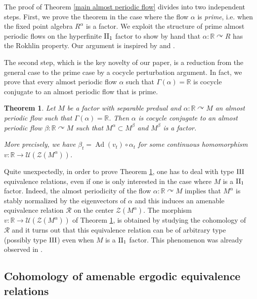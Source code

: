 \documentclass[a4paper,11pt]{amsart}
\numberwithin{equation}{section}
\newtheorem{letterthm}{Theorem}
\theoremstyle{definition}
\newcommand{\R}{\mathbb{R}}
\newcommand{\cZ}{\mathcal{Z}}
\newcommand{\cU}{\mathcal{U}}
\newcommand{\Ad}{\operatorname{Ad}}
\newcommand{\cR}{\mathcal{R}}
\newcommand{\II}{{\rm II}}
\newcommand{\III}{{\rm III}}
\begin{document}
The proof of Theorem \ref{main almost periodic flow} divides into two independent steps. First, we prove the theorem in the case where the flow $\alpha$ is \emph{prime}, i.e.\! when the fixed point algebra $R^\alpha$ is a factor. We exploit the structure of prime almost periodic flows on the hyperfinite $\II_1$ factor \cite{Jo82, OPT79} to show by hand that $\alpha : \R \curvearrowright R$ has the Rokhlin property. Our argument is inspired by \cite[Theorem 6.12]{MT12} and \cite[Proposition 2.5]{Ki95}.

The second step, which is the key novelty of our paper, is a reduction from the general case to the prime case by a cocycle perturbation argument. In fact, we prove that every almost periodic flow $\alpha$ such that $\Gamma(\alpha)=\R$ is cocycle conjugate to an almost periodic flow that is prime.
 
\begin{letterthm} \label{cocycle perturbation flow}
    Let $M$ be a factor with separable predual and $\alpha : \R \curvearrowright M$ an almost periodic flow such that $\Gamma(\alpha) = \R$. Then $\alpha$ is cocycle conjugate to an almost periodic flow $\beta : \R \curvearrowright M$ such that  $M^\alpha \subset M^\beta$ and $M^\beta$ is a factor.

    More precisely, we have $\beta_t= \Ad(v_t) \circ \alpha_t$ for some continuous homomorphism $v : \R \rightarrow \cU(\cZ(M^\alpha))$.
\end{letterthm}

Quite unexpectedly, in order to prove Theorem \ref{cocycle perturbation flow}, one has to deal with type $\III$ equivalence relations, even if one is only interested in the case where $M$ is a $\II_1$ factor. Indeed, the almost periodicity of the flow $\alpha : \R \curvearrowright M$ implies that $M^\alpha$ is stably normalized by the eigenvectors of $\alpha$ and this induces an amenable equivalence relation $\cR$ on the center $\cZ(M^\alpha)$. The morphism $v : \R \rightarrow \cU(\cZ(M^\alpha))$ of Theorem \ref{cocycle perturbation flow}, is obtained by studying the cohomology of $\cR$ and it turns out that this equivalence relation can be of arbitrary type (possibly type $\III$) even when $M$ is a $\II_1$ factor. This phenomenon was already observed in \cite{BHV15}.

\subsection{Cohomology of amenable ergodic equivalence relations}
\end{document}
